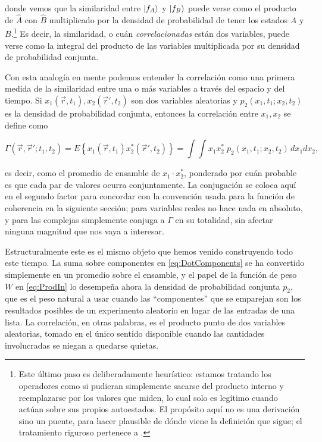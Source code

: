 	donde vemos que la similaridad entre $\ket{f_A}$ y $\ket{f_B}$ puede verse como el producto de $\hat{A}$ con $\hat{B}$ multiplicado por la densidad de probabilidad de tener los estados $A$ y $B$.\footnote{Este último paso es deliberadamente heurístico: estamos tratando los operadores como si pudieran simplemente sacarse del producto interno y reemplazarse por los valores que miden, lo cual solo es legítimo cuando actúan sobre sus propios autoestados. El propósito aquí no es una derivación sino un puente, para hacer plausible de dónde viene la definición que sigue; el tratamiento riguroso pertenece a \cite{mandel1995optical}.} Es decir, la similaridad, o cuán \textit{correlacionadas} están dos variables, puede verse como la integral del producto de las variables multiplicada por su densidad de probabilidad conjunta.

	Con esta analogía en mente podemos entender la correlación como una primera medida de la similaridad entre una o más variables a través del espacio y del tiempo. Si $x_1(\vec{r},t_1), x_2(\vec{r}',t_2)$ son dos variables aleatorias y $p_2(x_1,t_1;x_2,t_2)$ es la densidad de probabilidad conjunta, entonces la correlación entre $x_1,x_2$ se define como

	\begin{equation}\label{eq:CorrFunc}
		\Gamma(\vec{r},\vec{r}';t_1,t_2) = E\left\{ x_1(\vec{r},t_1) x_2^*(\vec{r}',t_2)\right\}
		= \int\!\!\int x_1 x_2^* \; p_2(x_1,t_1;x_2,t_2)\, dx_1 dx_2,
	\end{equation}

	es decir, como el promedio de ensamble de $x_1\cdot x_2^*$, ponderado por cuán probable es que cada par de valores ocurra conjuntamente. La conjugación se coloca aquí en el segundo factor para concordar con la convención usada para la función de coherencia en la siguiente sección; para variables reales no hace nada en absoluto, y para las complejas simplemente conjuga a $\Gamma$ en su totalidad, sin afectar ninguna magnitud que nos vaya a interesar.

	Estructuralmente este es el mismo objeto que hemos venido construyendo todo este tiempo. La suma sobre componentes en \eqref{eq:DotComponents} se ha convertido simplemente en un promedio sobre el ensamble, y el papel de la función de peso $W$ en \eqref{eq:ProdIn} lo desempeña ahora la densidad de probabilidad conjunta $p_2$, que es el peso natural a usar cuando las ``componentes'' que se emparejan son los resultados posibles de un experimento aleatorio en lugar de las entradas de una lista. La correlación, en otras palabras, es el producto punto de dos variables aleatorias, tomado en el único sentido disponible cuando las cantidades involucradas se niegan a quedarse quietas.

